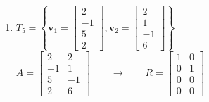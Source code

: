 \documentclass[12pt]{amsart}
\def\vecfour#1#2#3#4{\begin{bmatrix}#1\\#2\\#3\\#4\end{bmatrix}}
\begin{document}
\begin{enumerate}
\medskip
\noindent $A = \begin{bmatrix} 2 & -1 & 5 & 2 \\ 2 & 1 & -1 & 6 \end{bmatrix} \qquad \to \qquad R = \begin{bmatrix} 1 & 0 & 1 & 2 \\ 0 & 1 & -3 & 2 \end{bmatrix}$
\vfill

\item $T_5=\left\{ \mathbf{v}_1= \vecfour{2}{-1}{5}{2},\mathbf{v}_2= \vecfour{2}{1}{-1}{6} \right\}$\\

\medskip
\noindent $A = \begin{bmatrix} 2 & 2 \\ -1 & 1 \\ 5 & -1 \\ 2 & 6 \end{bmatrix} \qquad \to \qquad R = \begin{bmatrix} 1 & 0 \\ 0 & 1 \\ 0 & 0 \\ 0 & 0 \end{bmatrix}$
\vfill

\end{enumerate}
\end{document}
